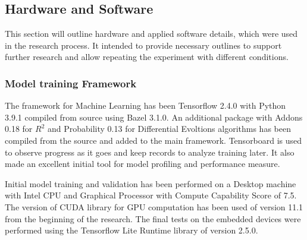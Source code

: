 \subsection{Hardware and Software} \label{subsec:soft}
This section will outline hardware and applied software details, which were used in the research process.
It intended to provide necessary outlines to support further research and allow repeating the experiment with different conditions.
\subsubsection{Model training Framework}
The framework for Machine Learning has been Tensorflow 2.4.0 with Python 3.9.1 compiled from source using Bazel 3.1.0.
An additional package with Addons 0.18 for $R^2$ and Probability 0.13 for Differential Evoltions algorithms has been compiled from the source and added to the main framework.
Tensorboard is used to observe progress as it goes and keep records to analyze training later. It also made an excellent initial tool for model profiling and performance measure.

%
%
Initial model training and validation has been performed on a Desktop machine with Intel CPU and Graphical Processor with Compute Capability Score of 7.5. The version of CUDA library for GPU computation has been used of version 11.1 from the beginning of the research.
The final tests on the embedded devices were performed using the Tensorflow Lite Runtime library of version 2.5.0.
%

